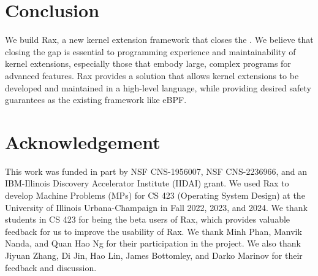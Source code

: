 \vspace{-8pt}
\section{Conclusion}
\label{sec:conclusion}
\vspace{-5pt}

We build Rax, a new kernel extension framework that closes the \gap{}. 
We believe that closing the gap is essential to  
    programming experience and maintainability of kernel extensions, especially
    those that embody large, complex programs for advanced features.
Rax provides a solution that allows kernel extensions to be developed and maintained
    in a high-level language, while providing desired safety guarantees 
    as the existing framework like eBPF.

\vspace{-8pt}
\section*{Acknowledgement}
\vspace{-5pt}

This work was funded in part by NSF CNS-1956007, NSF
CNS-2236966, and an IBM-Illinois Discovery Accelerator Institute (IIDAI) grant.
We used Rax to develop Machine Problems (MPs) for CS 423 (Operating System Design)
at the University of Illinois Urbana-Champaign in Fall 2022, 2023, and 2024.
We thank students in CS 423 for being the beta users of Rax, which 
    provides valuable feedback for us to improve the usability of Rax.
We thank Minh Phan, Manvik Nanda, and Quan Hao Ng for their participation
    in the project.
We also thank Jiyuan Zhang, Di Jin, Hao Lin, James Bottomley, and Darko Marinov for their
    feedback and discussion.

\begin{comment}
We have used Rax to develop three projects for an undergraduate OS course at the CS
    department in our university for two semesters.
The students were asked to implement a packet filter and a kprobe program using Rax.
In total, 67 students attempted one of the two projects, and 32 correctly implemented the Rax extension programs
    that pass all of our grader tests;
65 students implemented working Rax extensions with partial functionality (earning partial credit).
As OS learners,
    students found Rax easy to use and program with a low learning curve
    over Rust programming.
With positive feedback, we are evolving the projects to larger, more complex Rax extension programs.
\end{comment}
